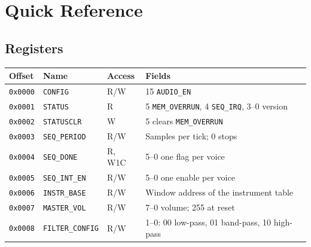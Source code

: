 \chapter{Quick Reference}
\label{app:quick-reference}

\section{Registers}

\begin{table}[H]
	\centering
	\small
	\begin{tabular}{lllp{6.2cm}}
		\toprule
		\textbf{Offset} & \textbf{Name}              & \textbf{Access} & \textbf{Fields}                                                                           \\
		\midrule
		\texttt{0x0000} & \texttt{CONFIG}            & R/W             & 15 \texttt{AUDIO\_EN}                                                                     \\
		\texttt{0x0001} & \texttt{STATUS}            & R               & 5 \texttt{MEM\_OVERRUN}, 4 \texttt{SEQ\_IRQ}, 3--0 version                                \\
		\texttt{0x0002} & \texttt{STATUSCLR}         & W               & 5 clears \texttt{MEM\_OVERRUN}                                                            \\
		\texttt{0x0003} & \texttt{SEQ\_PERIOD}       & R/W             & Samples per tick; 0 stops                                                                 \\
		\texttt{0x0004} & \texttt{SEQ\_DONE}         & R, W1C          & 5--0 one flag per voice                                                                   \\
		\texttt{0x0005} & \texttt{SEQ\_INT\_EN}      & R/W             & 5--0 one enable per voice                                                                 \\
		\texttt{0x0006} & \texttt{INSTR\_BASE}       & R/W             & Window address of the instrument table                                                    \\
		\texttt{0x0007} & \texttt{MASTER\_VOL}       & R/W             & 7--0 volume; 255 at reset                                                                 \\
		\texttt{0x0008} & \texttt{FILTER\_CONFIG}    & R/W             & 1--0: 00 low-pass, 01 band-pass, 10 high-pass                                             \\

\end{tabular}
\end{table}
